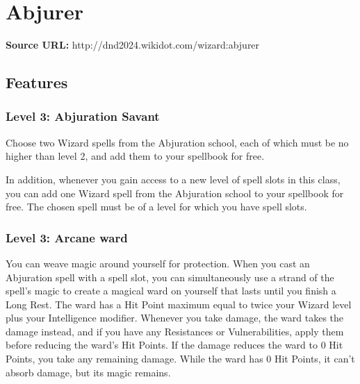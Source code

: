 \documentclass{article}
\begin{document}

\section*{ Abjurer }

\textbf{Source URL:} http://dnd2024.wikidot.com/wizard:abjurer

\vspace{1em}







\subsection*{Features}

\subsubsection*{ Level 3: Abjuration Savant }

Choose two Wizard spells from the Abjuration school, each of which must be no higher than level 2, and add them to your spellbook for free.

In addition, whenever you gain access to a new level of spell slots in this class, you can add one Wizard spell from the Abjuration school to your spellbook for free. The chosen spell must be of a level for which you have spell slots.

\vspace{1em}

\subsubsection*{ Level 3: Arcane ward }

You can weave magic around yourself for protection. When you cast an Abjuration spell with a spell slot, you can simultaneously use a strand of the spell's magic to create a magical ward on yourself that lasts until you finish a Long Rest. The ward has a Hit Point maximum equal to twice your Wizard level plus your Intelligence modifier. Whenever you take damage, the ward takes the damage instead, and if you have any Resistances or Vulnerabilities, apply them before reducing the ward’s Hit Points. If the damage reduces the ward to 0 Hit Points, you take any remaining damage. While the ward has 0 Hit Points, it can’t absorb damage, but its magic remains.
\end{document}
